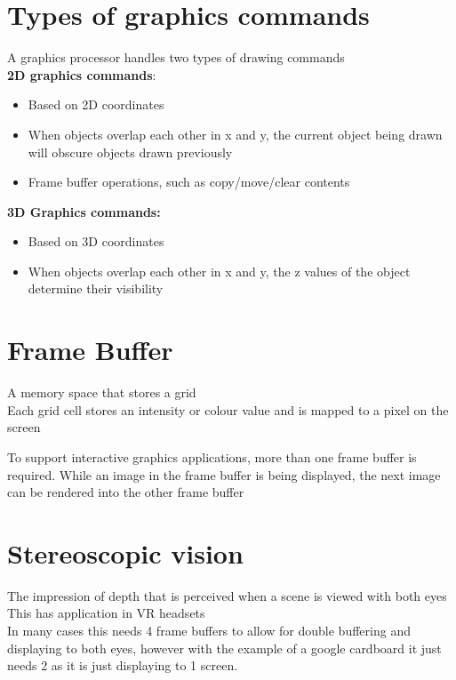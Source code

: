 \documentclass{article}[18pt]
\begin{document}
\section{Types of graphics commands}
A graphics processor handles two types of drawing commands\\
\textbf{2D graphics commands}:
\begin{itemize}
	\item Based on 2D coordinates
	\item When objects overlap each other in x and y, the current object being drawn will obscure objects drawn previously
	\item Frame buffer operations, such as copy/move/clear contents
\end{itemize}
\textbf{3D Graphics commands:}
\begin{itemize}
	\item Based on 3D coordinates
	\item When objects overlap each other in x and y, the z values of the object determine their visibility
\end{itemize}
\section{Frame Buffer}
\begin{defin}
	A memory space that stores a grid\\
	Each grid cell stores an intensity or colour value and is mapped to a pixel on the screen
\end{defin}
\begin{defin}
	To support interactive graphics applications, more than one frame buffer is required. While an image in the frame buffer is being displayed, the next image can be rendered into the other frame buffer
\end{defin}
\section{Stereoscopic vision}
\begin{defin}[Stereopsis]
The impression of depth that is perceived when a scene is viewed with both eyes\\
This has application in VR headsets\\
In many cases this needs 4 frame buffers to allow for double buffering and displaying to both eyes, however with the example of a google cardboard it just needs 2 as it is just displaying to 1 screen.
\end{defin}
\end{document}
